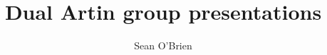 \documentclass{amsart}
\begin{document}
\title{Dual Artin group presentations}


\author{Sean O'Brien}
\address{}
\curraddr{}


%

\maketitle



% 

% 




\end{document}
